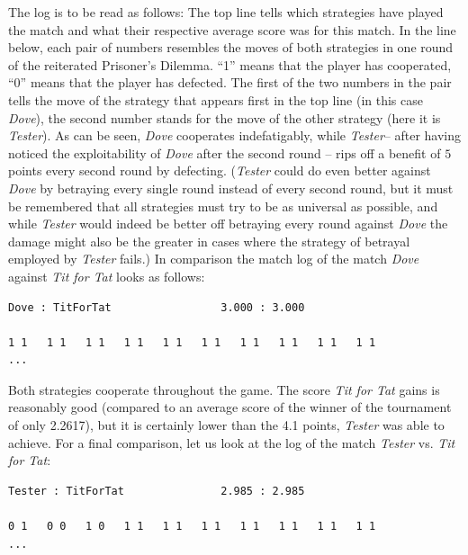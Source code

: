 The log is to be read as follows: The top line tells which strategies have
played the match and what their respective average score was for this match.
In the line below, each pair of numbers resembles the moves of both strategies
in one round of the reiterated Prisoner's Dilemma. ``1'' means that the player
has cooperated, ``0'' means that the player has defected. The first of the two
numbers in the pair tells the move of the strategy that appears first in the
top line (in this case {\em Dove}), the second number stands for the move of
the other strategy (here it is {\em Tester}). As can be seen, {\em Dove}
cooperates indefatigably, while {\em Tester}-- after having noticed the
exploitability of {\em Dove} after the second round -- rips off a benefit of
$5$ points every second round by defecting.  ({\em Tester} could do even better
against {\em Dove} by betraying every single round instead of every second
round, but it must be remembered that all strategies must try to be as
universal as possible, and while {\em Tester} would indeed be better off
betraying every round against {\em Dove} the damage might also be the greater
in cases where the strategy of betrayal employed by {\em Tester} fails.) In
comparison the match log of the match {\em Dove} against {\em Tit for Tat}
looks as follows:

\begin{verbatim}
Dove : TitForTat                 3.000 : 3.000

1 1   1 1   1 1   1 1   1 1   1 1   1 1   1 1   1 1   1 1
...  
\end{verbatim}

Both strategies cooperate throughout the game. The score {\em Tit for Tat}
gains is reasonably good (compared to an average score of the winner of the
tournament of only 2.2617), but it is certainly lower than the 4.1 points,
{\em Tester} was able to achieve. For a final comparison, let us look at the
log of the match {\em Tester} vs. {\em Tit for Tat}:

\begin{verbatim}
Tester : TitForTat               2.985 : 2.985

0 1   0 0   1 0   1 1   1 1   1 1   1 1   1 1   1 1   1 1 
...
\end{verbatim}

